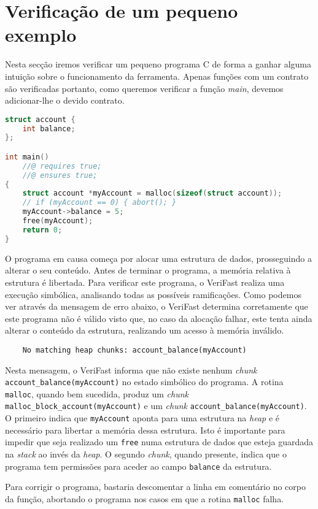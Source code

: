 \section{Verificação de um pequeno exemplo}

Nesta secção iremos verificar um pequeno programa C de forma a ganhar alguma intuição sobre o funcionamento da ferramenta. Apenas funções com um contrato são verificadas portanto, como queremos verificar a função \emph{main}, devemos adicionar-lhe o devido contrato.

\begin{lstlisting}[language=C]
struct account {
    int balance;
};

int main()
    //@ requires true;
    //@ ensures true;
{
    struct account *myAccount = malloc(sizeof(struct account));
    // if (myAccount == 0) { abort(); }
    myAccount->balance = 5;
    free(myAccount);
    return 0;
}
\end{lstlisting}

O programa em causa começa por alocar uma estrutura de dados, prosseguindo a alterar o seu conteúdo. Antes de terminar o programa, a memória relativa à estrutura é libertada. Para verificar este programa, o VeriFast realiza uma execução simbólica, analisando todas as possíveis ramificações. Como podemos ver através da mensagem de erro abaixo, o VeriFast determina corretamente que este programa não é válido visto que, no caso da alocação falhar, este tenta ainda alterar o conteúdo da estrutura, realizando um acesso à memória inválido.
\begin{lstlisting}
    No matching heap chunks: account_balance(myAccount)
\end{lstlisting}
Nesta mensagem, o VeriFast informa que não existe nenhum \emph{chunk} \texttt{account\_balance(myAccount)} no estado simbólico do programa. A rotina \texttt{malloc}, quando bem sucedida, produz um \textit{chunk} \texttt{malloc\_block\_account(myAccount)} e um \textit{chunk} \texttt{account\_balance(myAccount)}. O primeiro indica que \texttt{myAccount} aponta para uma estrutura na \textit{heap} e é necessário para libertar a memória dessa estrutura. Isto é importante para impedir que seja realizado um \texttt{free} numa estrutura de dados que esteja guardada na \textit{stack} ao invés da \textit{heap}. O segundo \textit{chunk}, quando presente, indica que o programa tem permissões para aceder ao campo \texttt{balance} da estrutura.

Para corrigir o programa, bastaria descomentar a linha em comentário no corpo da função, abortando o programa nos casos em que a rotina \texttt{malloc} falha. \\

